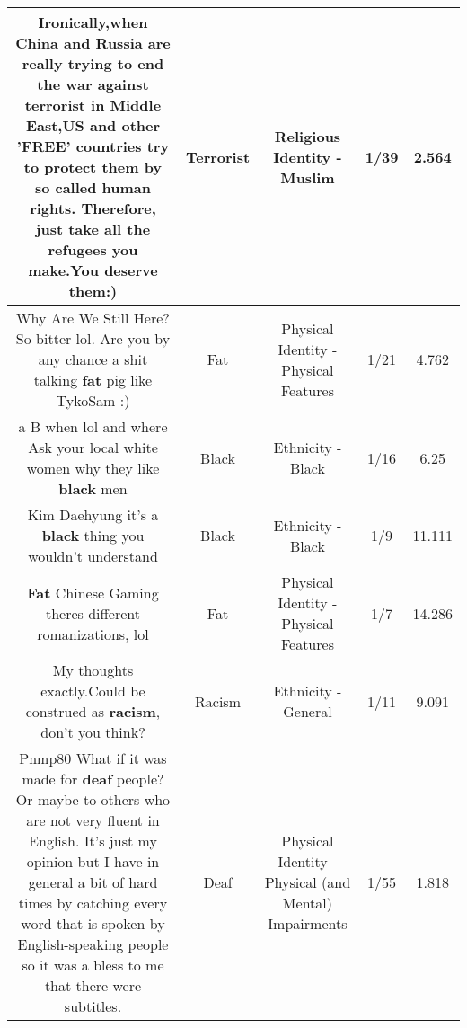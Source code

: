 \documentclass[11pt]{article}
\newlength\mylength
\begin{document}
\begin{center}
\begin{longtable}{|C{.65\mylength}|C{.30\mylength}|C{.12\mylength}|C{.12\mylength}|C{.12\mylength}|}
  \small Ironically,when China and Russia are really trying to end the war against \textbf{terrorist} in Middle East,US and other 'FREE' countries try to protect them by so called human rights. Therefore, just take all the refugees you make.You deserve them:)\normalsize   & Terrorist & Religious Identity - Muslim & 1/39 & 2.564 \\  \hline
  \small Why Are We Still Here? So bitter lol. Are you by any chance a shit talking \textbf{fat} pig like TykoSam :)\normalsize   & Fat & Physical Identity - Physical Features & 1/21 & 4.762 \\  \hline
  \small a B when lol and where Ask your local white women why they like \textbf{black} men\normalsize   & Black & Ethnicity - Black & 1/16 & 6.25 \\  \hline
  \small Kim Daehyung it's a \textbf{black} thing you wouldn't understand\normalsize   & Black & Ethnicity - Black & 1/9 & 11.111 \\  \hline
  \small \@\textbf{Fat} Chinese Gaming theres different romanizations, lol\normalsize   & Fat & Physical Identity - Physical Features & 1/7 & 14.286 \\  \hline
  \small My thoughts exactly.Could be construed as \textbf{racism}, don't you think?\normalsize   & Racism & Ethnicity - General & 1/11 & 9.091 \\  \hline
  \small Pnmp80 What if it was made for \textbf{deaf} people? Or maybe to others who are not very fluent in English. It's just my opinion but I have in general a bit of hard times by catching every word that is spoken by English-speaking people so it was a bless to me that there were subtitles.\normalsize   & Deaf & Physical Identity - Physical (and Mental) Impairments & 1/55 & 1.818 \\  \hline

\end{longtable}
\end{center}
\end{document}

